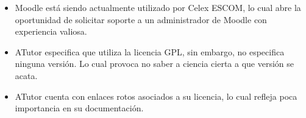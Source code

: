     \begin{itemize}
        \item Moodle está siendo actualmente utilizado por Celex ESCOM, lo cual abre la oportunidad de solicitar soporte a un administrador de Moodle con experiencia valiosa.
        \item ATutor especifica que utiliza la licencia GPL, sin embargo, no especifica ninguna versión. Lo cual provoca no saber a ciencia cierta a que versión se acata.
        \item ATutor cuenta con enlaces rotos asociados a su licencia, lo cual refleja poca importancia en su documentación.
    \end{itemize}
\clearpage    

